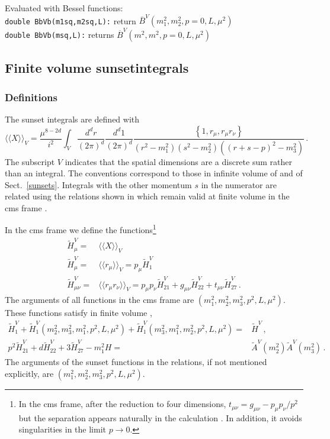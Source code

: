 \documentclass[12pt,a4paper]{article}
\newcommand{\mytt}[1]{\texttt{#1}}
\newcommand{\newfunction}[1]{\mytt{#1}\index{\mytt{#1}}}
\begin{document}
Evaluated with Bessel functions:\\
\mytt{double \newfunction{BbVb}(m1sq,m2sq,L):}
return $\overline{B}^V(m_1^2,m_2^2,p=0,L,\mu^2)$\\
\mytt{double \newfunction{BbVb}(msq,L):}
returns $\overline{B}^V(m^2,m^2,p=0,L,\mu^2)$\\

\subsection{Finite volume sunsetintegrals}

\subsubsection{Definitions}
\label{defFVsunset}

The sunset integrals are defined with
\begin{equation}
\langle\langle X \rangle\rangle_V =
\frac{\mu^{8-2d}}{i^2}\int_V\frac{d^d r}{(2\pi)^d}\frac{d^d 1}{(2\pi)^d}
\frac{\left\{1,r_\mu,r_\mu r_\nu\right\}}
{\left(r^2-m_1^2\right)\left(s^2-m_2^2\right)\left((r+s-p)^2-m_3^2\right)}\,.
\end{equation}
The subscript $V$ indicates that the spatial dimensions are a discrete
sum rather than an integral.
The conventions correspond to those in infinite volume of
\cite{Amoros:1999dp} and of Sect.~\ref{sunsets}.
Integrals with the other momentum $s$ in the numerator are related
using the relations shown in \cite{Amoros:1999dp} which remain
valid at finite volume in the cms frame \cite{Bijnens:2013doa}.

In the cms frame we define the functions\footnote{In the cms frame,
after the reduction to four dimensions,
$t_{\mu\nu}= g_{\mu\nu}-p_\mu p_\nu/p^2$ but the separation
appears naturally in the calculation \cite{Bijnens:2013doa}. In addition, it
avoids singularities in the limit $p\to0$.}
\begin{align}
\label{defHi}
\tilde H^V_\mu =& \langle\langle X \rangle\rangle_V
\\\nonumber
\tilde H^V_\mu =& \langle\langle r_\mu \rangle\rangle_V = p_\mu \tilde H^V_1\,
\\\nonumber
\tilde H^V_{\mu\nu} =&  \langle\langle r_\mu r_\nu \rangle\rangle_V
=p_\mu p_\nu \tilde H^V_{21} + g_{\mu\nu} \tilde H^V_{22} + t_{\mu\nu} \tilde H^V_{27}\,.
\end{align}
The arguments of all functions in the cms frame are
$(m_1^2,m_2^2,m_3^2,p^2,L,\mu^2)$.
These functions satisfy in finite
volume \cite{Bijnens:2013doa},
\begin{align}
\label{Hrelations}
\tilde H^V_1+
\tilde H^V_1(m_2^2,m_3^2,m_1^2,p^2,L,\mu^2)+
\tilde H^V_1(m_3^2,m_1^2,m_2^2,p^2,L,\mu^2)
=& \tilde H^V\,,
\nonumber\\
p^2 \tilde H^V_{21}+d \tilde H^V_{22} + 3 \tilde H^V_{27}-m_1^2 H =&
\tilde A^V(m_2^2)\tilde A^V(m_3^2)\,.
\end{align}
The arguments of the sunset functions in the relations, if not mentioned
explicitly, are  $(m_1^2,m_2^2,m_3^2,p^2,L,\mu^2)$.
\end{document}
